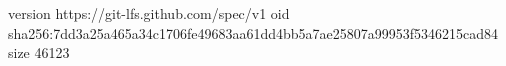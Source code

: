 version https://git-lfs.github.com/spec/v1
oid sha256:7dd3a25a465a34c1706fe49683aa61dd4bb5a7ae25807a99953f5346215cad84
size 46123
